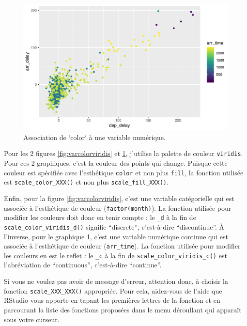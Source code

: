 \documentclass[a4paperpaper,]{article}
\begin{document}
\begin{figure}[htpb]

{\centering \includegraphics[width=0.9\linewidth]{figure/varcolorviridis2-1} 

}

\caption{Association de `color` à une variable numérique.}\label{fig:varcolorviridis2}
\end{figure}

Pour les 2 figures \ref{fig:varcolorviridis} et \ref{fig:varcolorviridis2}, j'utilise la palette de couleur \texttt{viridis}. Pour ces 2 graphiques, c'est la couleur des points qui change. Puisque cette couleur est spécifiée avec l'esthétique \texttt{color} et non plus \texttt{fill}, la fonction utilisée est \texttt{scale\_color\_XXX()} et non plus \texttt{scale\_fill\_XXX()}.

Enfin, pour la figure \ref{fig:varcolorviridis}, c'est une variable catégorielle qui est associée à l'esthétique de couleur (\texttt{factor(month)}). La fonction utilisée pour modifier les couleurs doit donc en tenir compte : le \texttt{\_d} à la fin de \texttt{scale\_color\_viridis\_d()} signifie ``discrete'', c'est-à-dire ``discontinue''. À l'inverse, pour le graphique \ref{fig:varcolorviridis2}, c'est une variable numérique continue qui est associée à l'esthétique de couleur (\texttt{arr\_time}). La fonction utilisée pour modifier les couleurs en est le reflet : le \texttt{\_c} à la fin de \texttt{scale\_color\_viridis\_c()} est l'abréviation de ``continuous'', c'est-à-dire ``continue''.

Si vous ne voulez pas avoir de message d'erreur, attention donc, à choisir la fonction \texttt{scale\_XXX\_XXX()} appropriée. Pour cela, aidez-vous de l'aide que RStudio vous apporte en tapant les premières lettres de la fonction et en parcourant la liste des fonctions proposées dans le menu déroullant qui apparaît sous votre curseur.
\end{document}
